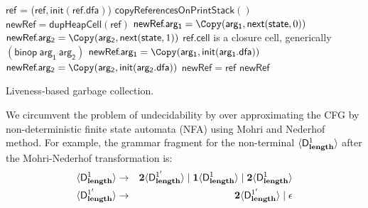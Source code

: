 \documentclass[9pt]{sigplanconf}
\begin{document}
\begin{algorithm}[t!]
  \Pro{\Lgc{}}
     {
            {$\mathsf{ref}$ = \Copy($\mathsf{ref}, \mathsf{init}(\mathsf{ref.dfa})$)\;}
            ${\mathsf{copyReferencesOnPrintStack}()}$\;  
     }
        {
             {
               $\mathsf{newRef} = \mathsf{dupHeapCell}(\mathsf{ref})$\;
                  {
                    {
                      $\mathsf{newRef}\!.\mathsf{arg_1}  = \Copy(\mathsf{arg_1}, \mathsf{next}(\mathsf{state}, 0))$\;
                    }
                    {
                      $\mathsf{newRef}\!.\mathsf{arg_2} =  \Copy(\mathsf{arg_2},
                      \mathsf{next}(\mathsf{state} , 1))$\;
                    }    
                  }
               \If
                  {$\mathsf{ref\!.cell}$ is a
                    closure cell, generically  $\mathsf{(binop~arg_1~arg_2)}$}
                   { 
                     $\mathsf{newRef}\!.\mathsf{arg_1} = \Copy(\mathsf{arg_1}, \mathsf{init}(\mathsf{arg_1.dfa}))$\;
                     $\mathsf{newRef}\!.\mathsf{arg_2} = \Copy(\mathsf{arg_2}, \mathsf{init}(\mathsf{arg_2.dfa}))$\;
                   }
             }
             {$\mathsf{newRef = ref}$}
\KwRet $\mathsf{newRef}$\;
        }
        \caption{Liveness-based garbage collection.  \label{algo:lgc-a}}
\end{algorithm}


We circumvent the problem of undecidability by over approximating the
CFG by non-deterministic finite state automata (NFA) using
Mohri  and Nederhof~\cite{mohri00regular} method.
For example, the grammar fragment for the non-terminal
$\langle \mathsf{D}_{\mathit {\mathbf{length}}}^{1}\rangle$ after the Mohri-Nederhof transformation is:
 \begin{eqnarray*}
   \langle \mathsf{D}_{\mathit {\mathbf{length}}}^{1}\rangle &\rightarrow& {\mathbf{2}}\langle \mathsf{D}_{\mathit {\mathbf{length}}}^{1'}\rangle \mid
   \mathbf{1}\langle \mathsf{D}_{\mathit {\mathbf{length}}}^{1}\rangle
   \mid {\mathbf{2}}\langle \mathsf{D}_{\mathit {\mathbf{length}}}^{1}\rangle\\
   \langle \mathsf{D}_{\mathit {\mathbf{length}}}^{1'}\rangle &\rightarrow& {\mathbf{2}}\langle \mathsf{D}_{\mathit {\mathbf{length}}}^{1'}\rangle
   \mid \epsilon
 \end{eqnarray*}
\end{document}
